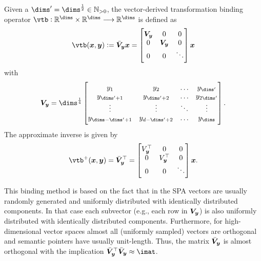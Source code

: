 \begin{defn}
    Given a $\dims' = \dims^{\frac{1}{2}} \in \mathbb{N}_{>0}$, the vector-derived transformation binding operator $\vtb: \mathbb{R}^{\dims} \times \mathbb{R}^{\dims} \longrightarrow \mathbb{R}^{\dims}$ is defined as
    \begin{equation}
        \vtb(\vc x, \vc y) := \bar{\mat V}_{\vc y} \vc x = \begin{bmatrix}
            \mat V_{\vc y} & 0 & 0 \\
            0 & \mat V_{\vc y} & 0 \\
            0 & 0 & \ddots
        \end{bmatrix} \vc x
    \end{equation}
    with
    \begin{equation}
        \mat V_{\vc y} = \dims^{\frac{1}{4}} \begin{bmatrix}
            y_1 & y_2 & \dotso & y_{\dims'} \\
            y_{\dims' + 1} & y_{\dims' + 2} & \dotso & y_{2\dims'} \\
            \vdots & \vdots & \ddots & \vdots \\
            y_{\dims - \dims' + 1} & y_{d - \dims' + 2} & \dotso & y_{\dims}
        \end{bmatrix} \text{.}
    \end{equation}
    The approximate inverse is given by
    \begin{equation}
        \vtb^+(\vc x, \vc y) = \bar{\mat V}_{\vc y}\Tr = \begin{bmatrix}
            V_{\vc y}\Tr & 0 & 0 \\
            0 & V_{\vc y}\Tr & 0 \\
            0 & 0 & \ddots
        \end{bmatrix} \vc x \text{.}
    \end{equation}
\end{defn}
This binding method is based on the fact that in the SPA vectors are usually randomly generated and uniformly distributed with identically distributed components.
In that case each subvector (e.g., each row in $\bm{V}_{\bm{y}}$) is also uniformly distributed with identically distributed components.
Furthermore, for high-dimensional vector spaces almost all (uniformly sampled) vectors are orthogonal and semantic pointers have usually unit-length.
Thus, the matrix $\bar{\bm{V}}_{\bm{y}}$ is almost orthogonal with the implication $\bar{\mat V}_{\vc y}\Tr \bar{\mat V}_{\vc y} \approx \imat$.
